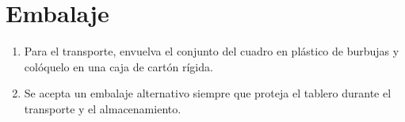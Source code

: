 \chapter{Embalaje}\label{ch:package}

\begin{enumerate}
    \item Para el transporte, envuelva el conjunto del cuadro en plástico de burbujas y colóquelo en una caja de cartón rígida.
    \item Se acepta un embalaje alternativo siempre que proteja el tablero durante el transporte y el almacenamiento.
\end{enumerate}
